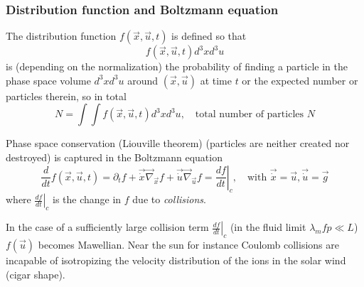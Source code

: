 \subsubsection{Distribution function and Boltzmann equation}
The distribution function $f(\vec{x}, \vec{u},t)$ is defined so that
\begin{equation}
    f(\vec{x},\vec{u},t) d^3xd^3u
\end{equation}
is (depending on the normalization) the probability of finding a particle in the
phase space volume $d^3xd^3u$ around $(\vec{x},\vec{u})$ at time $t$ or the expected
number or particles therein, so in total
\begin{equation}
    N = \int \int f(\vec{x},\vec{u},t) d^3xd^3u, \quad \text{total number of particles } N
\end{equation}
\begin{mdframed}[style = padded]
    Phase space conservation (Liouville theorem) (particles are neither created nor destroyed) is captured in the Boltzmann equation
    \begin{equation}
        \frac{d}{dt} f(\vec{x},\vec{u},t) = \partial_t f + \vec{\dot{x}} \vec{\nabla}_\vec{x} f + \vec{\dot{u}} \vec{\nabla}_\vec{u} f = \left. \frac{df}{dt} \right|_c, \quad \text{with } \vec{\dot{x}} = \vec{u}, \vec{\dot{u}} = \vec{g}
    \end{equation}  
    where $\left. \frac{df}{dt} \right|_c$ is the change in $f$ due to \textit{collisions}. 
\end{mdframed}
In the case of a sufficiently large collision term $\left. \frac{df}{dt} \right|_c$ (in the fluid limit $\lambda_mfp\ll L$) $f(\vec{u})$
becomes Mawellian. Near the sun for instance Coulomb collisions are incapable of isotropizing the velocity distribution of the 
ions in the solar wind (cigar shape).


